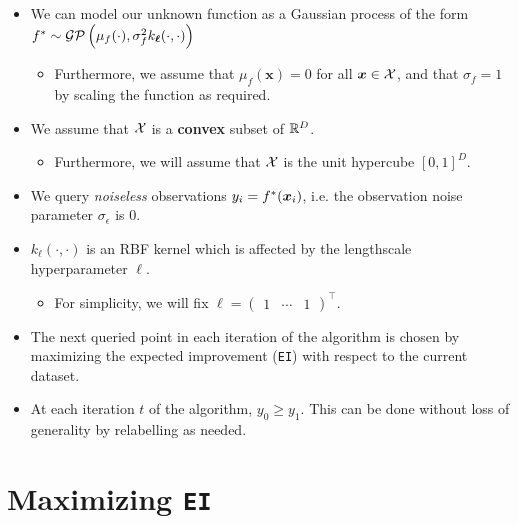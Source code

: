 \documentclass[11pt]{article}
\numberwithin{figure}{section}
\numberwithin{equation}{section}
\def\EI{\texttt{EI}}
\def\calGP{\mathcal{GP}}
\newcommand{\bs}[1]{\boldsymbol{#1}}
\def\bsx{\bs{x}}
\def\bell{\bs{\ell}}
\begin{document}
\begin{itemize}[label=]

  \item We can model our unknown function as a Gaussian process of the form $\fstar \sim \calGP\left(\mu_{f}(\cdot), \sigma_{f}^{2}k_{\bell}(\cdot, \cdot)\right)$
  \begin{itemize}[label=]
    \item Furthermore, we assume that $\mu_{f}(\bsx) = 0$ for all $\bsx \in \calX$, and that $\sigma_{f} = 1$ by scaling the function as required.
  \end{itemize}

  \item We assume that $\mathcal{X}$ is a \textbf{convex} subset of $\mathbb{R}^{D}$. 
  \begin{itemize}[label=]
    \item Furthermore, we will assume that $\mathcal{X}$ is the unit hypercube $[0, 1]^{D}$.
  \end{itemize}

  \item We query \textit{noiseless} observations $y_{i} = \fstar(\bsx_{i})$, i.e. the observation noise parameter $\sigma_{\epsilon}$ is 0. 

  \item $k_{\bell}(\cdot, \cdot)$ is an RBF kernel which is affected by the lengthscale hyperparameter $\bell$.
  \begin{itemize}[label=]
    \item For simplicity, we will fix $\bell = \begin{pmatrix}1 & \cdots & 1 \end{pmatrix}^{\top}$.
  \end{itemize}

  \item The next queried point in each iteration of the algorithm is chosen by maximizing the expected improvement (\EI{}) with respect to the current dataset. 

  \item At each iteration $t$ of the algorithm, $y_{0} \ge y_{1}$. This can be done without loss of generality by relabelling as needed.
\end{itemize}

\newpage

\section{Maximizing \EI}
\end{document}
